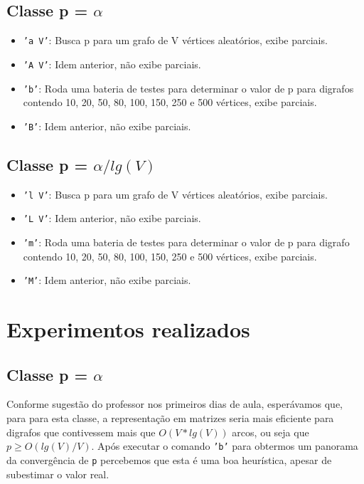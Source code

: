 \documentclass[brazil,times]{abnt}
\begin{document}
\subsection*{Classe p = $\alpha$}
\begin{itemize}
	\item[] \texttt{'a V'}: Busca p para um grafo de V vértices aleatórios, exibe parciais.
	\item[] \texttt{'A V'}: Idem anterior, não exibe parciais.
	\item[] \texttt{'b'}: Roda uma bateria de testes para determinar o valor de p para digrafos contendo 10, 20, 50, 80, 100, 150, 250 e 500 vértices, exibe parciais.
	\item[] \texttt{'B'}: Idem anterior, não exibe parciais.
\end{itemize}

\subsection*{Classe p = $\alpha/lg(V)$}
\begin{itemize}
	\item[] \texttt{'l V'}: Busca p para um grafo de V vértices aleatórios, exibe parciais.
	\item[] \texttt{'L V'}: Idem anterior, não exibe parciais.
	\item[] \texttt{'m'}: Roda uma bateria de testes para determinar o valor de p para digrafo contendo 10, 20, 50, 80, 100, 150, 250 e 500 vértices, exibe parciais.
	\item[] \texttt{'M'}: Idem anterior, não exibe parciais.
\end{itemize}

\section*{Experimentos realizados}
\subsection*{Classe p = $\alpha$}
Conforme sugestão do professor nos primeiros dias de aula, esperávamos que, para para esta classe, a representação em matrizes seria mais eficiente para digrafos que contivessem mais que $O(V*lg(V))$ arcos, ou seja que $p \ge O(lg(V)/V)$. Após executar o comando \texttt{'b'} para obtermos um panorama da convergência de \texttt{p} percebemos que esta é uma boa heurística, apesar de subestimar o valor real.
\end{document}

